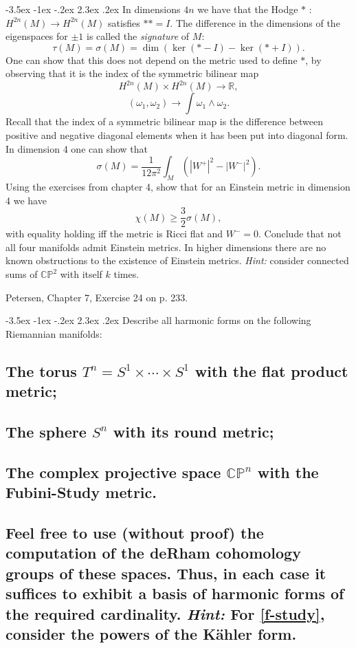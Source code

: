 \documentclass[10pt]{article}
\makeatletter
\renewcommand\section{\@startsection{section}{1}{\z@}%
                                  {-3.5ex \@plus -1ex \@minus -.2ex}%
                                  {2.3ex \@plus.2ex}%
                                  {\normalfont\large\bfseries}}
\newcommand{\CP}{\ensuremath{\mathbb{CP}}}
\newcommand{\R}{\ensuremath{\mathbb{R}}}
\DeclareMathOperator{\2}{II}
\newcommand{\hint}[1]{{\emph{Hint:} #1}} %
\newcommand{\pets}[3]{{Petersen, Chapter #1, Exercise #2 on p. #3.}}
\makeatother
\begin{document}

\section{In dimensions $4n$ we have that the Hodge $*$ : $H^{2n}(M) \to H^{2n}(M)$ satisfies $**=I.$ The difference in the dimensions of the eigenspaces for $\pm 1$ is called the \emph{signature} of $M:$ $$\tau(M) = \sigma(M) = \dim( \ker (*-I) - \ker (*+I)).$$ One can show that this does not depend on the metric used to define $*$, by observing that it is the index of the symmetric bilinear map $$H^{2n}(M) \times H^{2n}(M) \to \R, $$ $$(\omega_1, \omega_2) \to \int \omega_1 \wedge \omega_2.$$ Recall that the index of a symmetric bilinear map is the difference between positive and negative diagonal elements when it has been put into diagonal form. In dimension 4 one can show that $$\sigma(M) = \frac{1}{12 \pi^2} \int_M \left(  \left| W^+ \right|^2 - \left| W^- \right|^2 \right).$$ Using the exercises from chapter 4, show that for an Einstein metric in dimension 4 we have $$\chi(M) \geq \frac{3}{2} \sigma(M),$$ with equality holding iff the metric is Ricci flat and $W^-=0.$ Conclude that not all four manifolds admit Einstein metrics. In higher dimensions there are no known obstructions to the existence of Einstein metrics. \hint{consider connected sums of $\CP^2$ with itself $k$ times.}}

\pets{7}{24}{233}

\section{Describe all harmonic forms on the following Riemannian manifolds:}
\subsection{The torus $T^n = S^1 \times \cdots \times S^1$ with the flat product metric;}
\subsection{The sphere $S^n$ with its round metric;}
\subsection{\label{f-study}The complex projective space $\CP^n$ with the Fubini-Study metric.}
\subsection*{Feel free to use (without proof) the computation of the deRham cohomology groups of these spaces. Thus, in each case it suffices to exhibit a basis of harmonic forms of the required cardinality.  \hint{For \ref{f-study}, consider the powers of the K\"ahler form.}}
\end{document}
